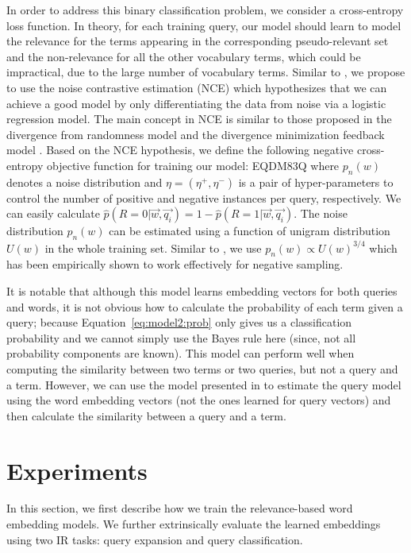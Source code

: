 \documentclass[sigconf]{acmart}
\begin{document}
In order to address this binary classification problem, we consider a cross-entropy loss function. In theory, for each training query, our model should learn to model the relevance for the terms appearing in the corresponding pseudo-relevant set and the non-relevance for all the other vocabulary terms, which could be impractical, due to the large number of vocabulary terms. Similar to \cite{Mikolov:2013}, we propose to use the noise contrastive estimation (NCE) \cite{Gutmann:2012} which hypothesizes that we can achieve a good model by only differentiating the data from noise via a logistic regression model. The main concept in NCE is similar to those proposed in the divergence from randomness model \cite{Amati:2002} and the divergence minimization feedback model \cite{Zhai:2001}. Based on the NCE hypothesis, we define the following negative cross-entropy objective function for training our model:
EQDM83Q
where $p_n(w)$ denotes a noise distribution and $\eta = (\eta^+, \eta^-)$ is a pair of hyper-parameters to control the number of positive and negative instances per query, respectively. We can easily calculate $\widehat{p}(R=0 | \vec{w}, \vec{q_i}) = 1 - \widehat{p}(R=1 | \vec{w}, \vec{q_i})$. The noise distribution $p_n(w)$ can be estimated using a function of unigram distribution $U(w)$ in the whole training set. Similar to \cite{Mikolov:2013}, we use $p_n(w) \propto U(w)^{3/4}$ which has been empirically shown to work effectively for negative sampling.

It is notable that although this model learns embedding vectors for both queries and words, it is not obvious how to calculate the probability of each term given a query; because {Equation}~\ref{eq:model2:prob} only gives us a classification probability and we cannot simply use the Bayes rule here (since, not all probability components are known). This model can perform well when computing the similarity between two terms or two queries, but not a query and a term. However, we can use the model presented in \cite{Zamani:2016:ICTIR:pqv} to estimate the query model using the word embedding vectors (not the ones learned for query vectors) and then calculate the similarity between a query and a term. 

\section{Experiments}
\label{sec:exp}
In this section, we first describe how we train the relevance-based word embedding models. We further extrinsically evaluate the learned embeddings using two IR tasks: query expansion and query classification.
\end{document}
